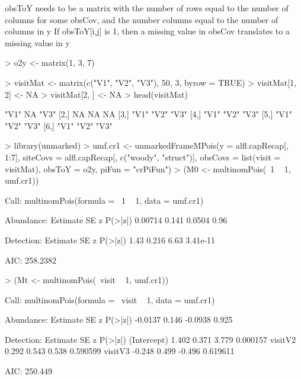 \documentclass[a4paper]{article}
\renewenvironment{Schunk}{\vspace{\topsep}}{\vspace{\topsep}}
\begin{document}
obsToY needs to be a matrix with
the number of rows equal to the number of columns for some obsCov, and
the number columns equal to the number of columns in y
If obsToY[i,j] is 1, then a missing value in obsCov translates to
a missing value in y

\begin{Schunk}
\begin{Sinput}
> o2y <- matrix(1, 3, 7)
\end{Sinput}
\end{Schunk}



\begin{Schunk}
\begin{Sinput}
> visitMat <- matrix(c("V1", "V2", "V3"), 50, 3, byrow = TRUE)
> visitMat[1, 2] <- NA
> visitMat[2, ] <- NA
> head(visitMat)
\end{Sinput}
\begin{Soutput}
     [,1] [,2] [,3]
[1,] "V1" NA   "V3"
[2,] NA   NA   NA  
[3,] "V1" "V2" "V3"
[4,] "V1" "V2" "V3"
[5,] "V1" "V2" "V3"
[6,] "V1" "V2" "V3"
\end{Soutput}
\begin{Sinput}
> library(unmarked)
> umf.cr1 <- unmarkedFrameMPois(y = alfl.capRecap[, 1:7], 
     siteCovs = alfl.capRecap[, c("woody", "struct")], 
     obsCovs = list(visit = visitMat), obsToY = o2y, piFun = "crPiFun")
> (M0 <- multinomPois(~1 ~ 1, umf.cr1))
\end{Sinput}
\begin{Soutput}
Call:
multinomPois(formula = ~1 ~ 1, data = umf.cr1)

Abundance:
 Estimate    SE      z P(>|z|)
  0.00714 0.141 0.0504    0.96

Detection:
 Estimate    SE    z  P(>|z|)
     1.43 0.216 6.63 3.41e-11

AIC: 258.2382 
\end{Soutput}
\end{Schunk}




\begin{Schunk}
\begin{Sinput}
> (Mt <- multinomPois(~visit ~ 1, umf.cr1))
\end{Sinput}
\begin{Soutput}
Call:
multinomPois(formula = ~visit ~ 1, data = umf.cr1)

Abundance:
 Estimate    SE       z P(>|z|)
  -0.0137 0.146 -0.0938   0.925

Detection:
            Estimate    SE      z  P(>|z|)
(Intercept)    1.402 0.371  3.779 0.000157
visitV2        0.292 0.543  0.538 0.590599
visitV3       -0.248 0.499 -0.496 0.619611

AIC: 250.449 
\end{Soutput}
\end{Schunk}
\end{document}
